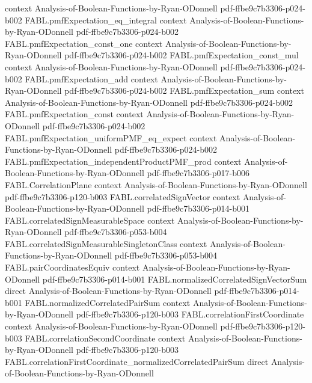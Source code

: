 \begin{theorem}
  {context}
  {Analysis-of-Boolean-Functions-by-Ryan-ODonnell}
  {pdf-ffbe9c7b3306-p024-b002}
\proofstep
  {FABL.pmfExpectation_eq_integral}
  {context}
  {Analysis-of-Boolean-Functions-by-Ryan-ODonnell}
  {pdf-ffbe9c7b3306-p024-b002}
\proofstep
  {FABL.pmfExpectation_const_one}
  {context}
  {Analysis-of-Boolean-Functions-by-Ryan-ODonnell}
  {pdf-ffbe9c7b3306-p024-b002}
\proofstep
  {FABL.pmfExpectation_const_mul}
  {context}
  {Analysis-of-Boolean-Functions-by-Ryan-ODonnell}
  {pdf-ffbe9c7b3306-p024-b002}
\proofstep
  {FABL.pmfExpectation_add}
  {context}
  {Analysis-of-Boolean-Functions-by-Ryan-ODonnell}
  {pdf-ffbe9c7b3306-p024-b002}
\proofstep
  {FABL.pmfExpectation_sum}
  {context}
  {Analysis-of-Boolean-Functions-by-Ryan-ODonnell}
  {pdf-ffbe9c7b3306-p024-b002}
\proofstep
  {FABL.pmfExpectation_const}
  {context}
  {Analysis-of-Boolean-Functions-by-Ryan-ODonnell}
  {pdf-ffbe9c7b3306-p024-b002}
\proofstep
  {FABL.pmfExpectation_uniformPMF_eq_expect}
  {context}
  {Analysis-of-Boolean-Functions-by-Ryan-ODonnell}
  {pdf-ffbe9c7b3306-p024-b002}
\proofstep
  {FABL.pmfExpectation_independentProductPMF_prod}
  {context}
  {Analysis-of-Boolean-Functions-by-Ryan-ODonnell}
  {pdf-ffbe9c7b3306-p017-b006}
\proofstep
  {FABL.CorrelationPlane}
  {context}
  {Analysis-of-Boolean-Functions-by-Ryan-ODonnell}
  {pdf-ffbe9c7b3306-p120-b003}
\proofstep
  {FABL.correlatedSignVector}
  {context}
  {Analysis-of-Boolean-Functions-by-Ryan-ODonnell}
  {pdf-ffbe9c7b3306-p014-b001}
\proofstep
  {FABL.correlatedSignMeasurableSpace}
  {context}
  {Analysis-of-Boolean-Functions-by-Ryan-ODonnell}
  {pdf-ffbe9c7b3306-p053-b004}
\proofstep
  {FABL.correlatedSignMeasurableSingletonClass}
  {context}
  {Analysis-of-Boolean-Functions-by-Ryan-ODonnell}
  {pdf-ffbe9c7b3306-p053-b004}
\proofstep
  {FABL.pairCoordinatesEquiv}
  {context}
  {Analysis-of-Boolean-Functions-by-Ryan-ODonnell}
  {pdf-ffbe9c7b3306-p014-b001}
\proofstep
  {FABL.normalizedCorrelatedSignVectorSum}
  {direct}
  {Analysis-of-Boolean-Functions-by-Ryan-ODonnell}
  {pdf-ffbe9c7b3306-p014-b001}
\proofstep
  {FABL.normalizedCorrelatedPairSum}
  {context}
  {Analysis-of-Boolean-Functions-by-Ryan-ODonnell}
  {pdf-ffbe9c7b3306-p120-b003}
\proofstep
  {FABL.correlationFirstCoordinate}
  {context}
  {Analysis-of-Boolean-Functions-by-Ryan-ODonnell}
  {pdf-ffbe9c7b3306-p120-b003}
\proofstep
  {FABL.correlationSecondCoordinate}
  {context}
  {Analysis-of-Boolean-Functions-by-Ryan-ODonnell}
  {pdf-ffbe9c7b3306-p120-b003}
\proofstep
  {FABL.correlationFirstCoordinate_normalizedCorrelatedPairSum}
  {direct}
  {Analysis-of-Boolean-Functions-by-Ryan-ODonnell}

\end{theorem}
